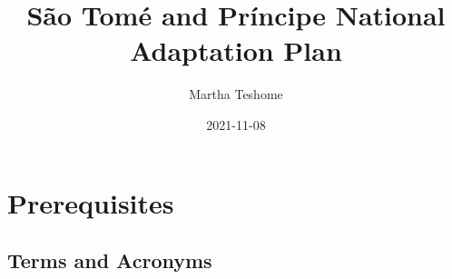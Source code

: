 \documentclass[
]{book}
\title{São Tomé and Príncipe National Adaptation Plan}
\author{Martha Teshome}
\date{2021-11-08}
\begin{document}
\maketitle

{
\setcounter{tocdepth}{1}
\tableofcontents
}
\hypertarget{prerequisites}{%
\chapter*{Prerequisites}\label{prerequisites}}

\hypertarget{terms-and-acronyms}{%
\section*{Terms and Acronyms}\label{terms-and-acronyms}}

\providecommand{\docline}[3]{\noalign{\global\setlength{\arrayrulewidth}{#1}}\arrayrulecolor[HTML]{#2}\cline{#3}}

\setlength{\tabcolsep}{2pt}

\renewcommand*{\arraystretch}{1.5}
\end{document}
